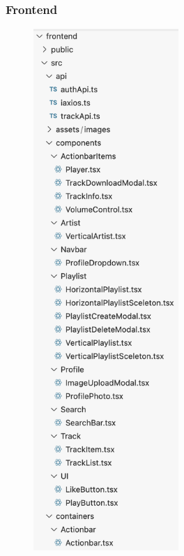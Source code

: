 \documentclass[a4paper]{article}
\begin{document}
\subsubsection{Frontend}
\begin{figure}[h!]
\begin{center}
\includegraphics[width=5.5cm]{frontend_folder_1.png}
\end{center}
\end{figure}
\end{document}
